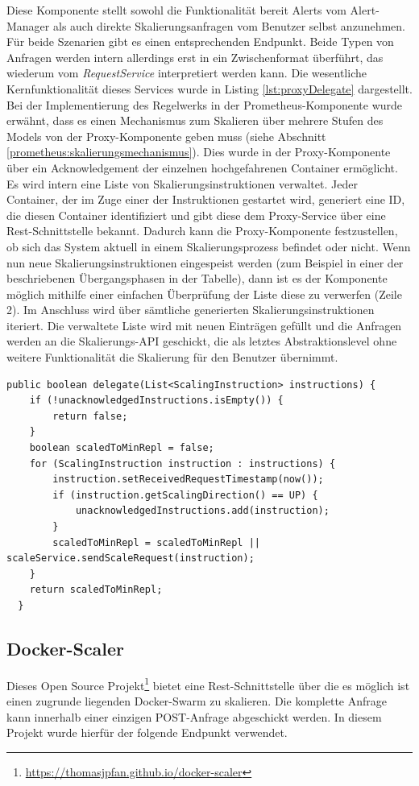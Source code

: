 Diese Komponente stellt sowohl die Funktionalität bereit Alerts vom Alert-Manager als auch direkte Skalierungsanfragen vom Benutzer selbst anzunehmen. Für beide Szenarien gibt es einen entsprechenden Endpunkt. Beide Typen von Anfragen werden intern allerdings erst in ein Zwischenformat überführt, das wiederum vom \emph{RequestService} interpretiert werden kann. Die wesentliche Kernfunktionalität dieses Services wurde in Listing \ref{lst:proxyDelegate} dargestellt. Bei der Implementierung des Regelwerks in der Prometheus-Komponente wurde erwähnt, dass es einen Mechanismus zum Skalieren über mehrere Stufen des Models von der Proxy-Komponente geben muss (siehe Abschnitt \ref{prometheus:skalierungsmechanismus}). Dies wurde in der Proxy-Komponente über ein Acknowledgement der einzelnen hochgefahrenen Container ermöglicht. Es wird intern eine Liste von Skalierungsinstruktionen verwaltet. Jeder Container, der im Zuge einer der Instruktionen gestartet wird, generiert eine ID, die diesen Container identifiziert und gibt diese dem Proxy-Service über eine Rest-Schnittstelle bekannt. Dadurch kann die Proxy-Komponente festzustellen, ob sich das System aktuell in einem Skalierungsprozess befindet oder nicht. Wenn nun neue Skalierungsinstruktionen eingespeist werden (zum Beispiel in einer der beschriebenen Übergangsphasen in der Tabelle), dann ist es der Komponente möglich mithilfe einer einfachen Überprüfung der Liste diese zu verwerfen (Zeile 2). Im Anschluss wird über sämtliche generierten Skalierungsinstruktionen iteriert. Die verwaltete Liste wird mit neuen Einträgen gefüllt und die Anfragen werden an die Skalierungs-API geschickt, die als letztes Abstraktionslevel ohne weitere Funktionalität die Skalierung für den Benutzer übernimmt. 

\begin{lstlisting}[style=javaStyle,caption={Proxy Scaler - RequestService},label=lst:proxyDelegate]
  public boolean delegate(List<ScalingInstruction> instructions) {
    if (!unacknowledgedInstructions.isEmpty()) {
        return false;
    }
    boolean scaledToMinRepl = false;
    for (ScalingInstruction instruction : instructions) {
        instruction.setReceivedRequestTimestamp(now());
        if (instruction.getScalingDirection() == UP) {
            unacknowledgedInstructions.add(instruction);
        }
        scaledToMinRepl = scaledToMinRepl || scaleService.sendScaleRequest(instruction);
    }
    return scaledToMinRepl;
  }
\end{lstlisting}


\subsection{Docker-Scaler}
Dieses Open Source Projekt\footnote{\url{https://thomasjpfan.github.io/docker-scaler}} bietet eine Rest-Schnittstelle über die es möglich ist einen zugrunde liegenden Docker-Swarm zu skalieren. Die komplette Anfrage kann innerhalb einer einzigen POST-Anfrage abgeschickt werden. In diesem Projekt wurde hierfür der folgende Endpunkt verwendet.

